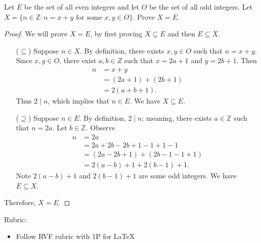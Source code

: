 \documentclass{article}
\newcommand{\Z}{\mathbb{Z}}
\theoremstyle{definition}
\begin{document}
\begin{question}
   Let $E$ be the set of all even integers and let $O$ be the set of all odd integers. Let $X=\{ n\in \Z : n = x+y \text{ for some } x, y\in O\}$. Prove $X=E$.
\end{question}
\begin{solution}
\begin{proof}
We will prove $X=E$, by first proving $X \subseteq E$ and then $E\subseteq X$.
\begin{enumerate}
\item[($\subseteq$)] Suppose $n\in X$. By definition, there exists $x, y \in O$ such that $n= x+y$. Since $x, y\in O$, there exist $a, b\in Z$ such that $x=2a+1$ and $y=2b+1$. Then
\begin{align*}
n &= x+ y \\
&= (2a+1) + (2b+1)\\
& = 2(a+b+1).
\end{align*}
Thus $2 \mid n$, which implies that $n\in E$. We have $X\subseteq E$.

\item [($\supseteq$)] Suppose $n\in E$. By definition, $2 \mid n$; meaning, there exists $a\in \Z$ such that $n=2a$. Let $b\in \Z$. Observe
\begin{align*}
n &= 2a\\
&= 2a + 2b - 2b + 1 -1 + 1 -1\\
& = (2a - 2b +1) + (2b -1 -1 + 1)\\
& = 2(a-b) + 1 + 2(b-1) + 1.
\end{align*}
Note $2(a-b) + 1$ and  $2(b-1) + 1$ are some odd integers. We have $E\subseteq X$.
\end{enumerate}
Therefore, $X=E$.
\end{proof}
{\color{red} Rubric:
\begin{itemize}
\item Follow RVF rubric with 1P for \LaTeX
\end{itemize}}
\end{solution}
\end{document}
